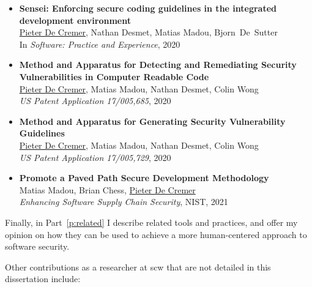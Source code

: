 \begin{itemize}
 \item 
 \textbf{Sensei: Enforcing secure coding guidelines in the integrated development environment}\\
 \underline{Pieter De Cremer}, Nathan Desmet, Matias Madou, \mbox{Bjorn De Sutter}\\
 In \emph{Software: Practice and Experience}, 2020
    
 \item 
 \textbf{Method and Apparatus for Detecting and Remediating Security Vulnerabilities in Computer Readable Code}\\
 \underline{Pieter De Cremer}, Matias Madou, Nathan Desmet, Colin Wong\\
 \emph{US Patent Application 17/005,685}, 2020
 
 \item 
 \textbf{Method and Apparatus for Generating Security Vulnerability Guidelines}\\
 \underline{Pieter De Cremer}, Matias Madou, Nathan Desmet, Colin Wong\\
 \emph{US Patent Application 17/005,729}, 2020
 
 \item 
 \textbf{Promote a Paved Path Secure Development Methodology}\\
 Matias Madou, Brian Chess, \underline{Pieter De Cremer}\\
 \emph{Enhancing Software Supply Chain Security}, NIST, 2021
\end{itemize}

Finally, in Part~\ref{p:related} I describe related tools and practices, and offer my opinion on how they can be used to achieve a more human-centered approach to software security.

Other contributions as a researcher at 
\gls{scw} that are not detailed in this dissertation include:

